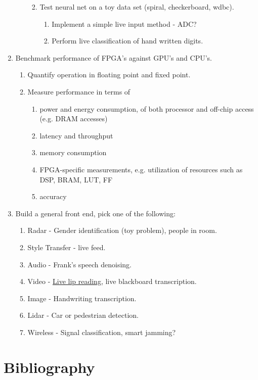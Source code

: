 \documentclass[12pt]{article}
\begin{document}
\begin{enumerate}
\begin{enumerate}
\begin{enumerate}
\begin{enumerate}
          \end{enumerate}
        \item Test neural net on a toy data set (spiral, checkerboard, wdbc).\
          \begin{enumerate}
            \item Implement a simple live input method - ADC?
            \item Perform live classification of hand written digits.
          \end{enumerate}
      \end{enumerate}
    \end{enumerate}
  \item Benchmark performance of FPGA's against GPU's and CPU's.
    \begin{enumerate}
      \item Quantify operation in floating point and fixed point.
      \item Measure performance in terms of 
          \begin{enumerate}
              \item power and energy consumption, of both processor and off-chip access (e.g. DRAM accesses)
              \item latency and throughput
              \item memory consumption
              \item FPGA-specific measurements, e.g. utilization of resources such as DSP, BRAM,  LUT, FF
              \item accuracy
          \end{enumerate}
    \end{enumerate}
  \item Build a general front end, pick one of the following:
    \begin{enumerate}
      \item Radar - Gender identification (toy problem), people in room.
      \item Style Transfer - live feed.
      \item Audio - Frank's speech denoising.
      \item Video - \href{https://arxiv.org/pdf/1611.01599.pdf}{Live lip reading}, live 
        blackboard transcription.
      \item Image - Handwriting transcription.
      \item Lidar - Car or pedestrian detection.
      \item Wireless - Signal classification, smart jamming?
    \end{enumerate}
  \end{enumerate}
\section{Bibliography}
\end{document}

